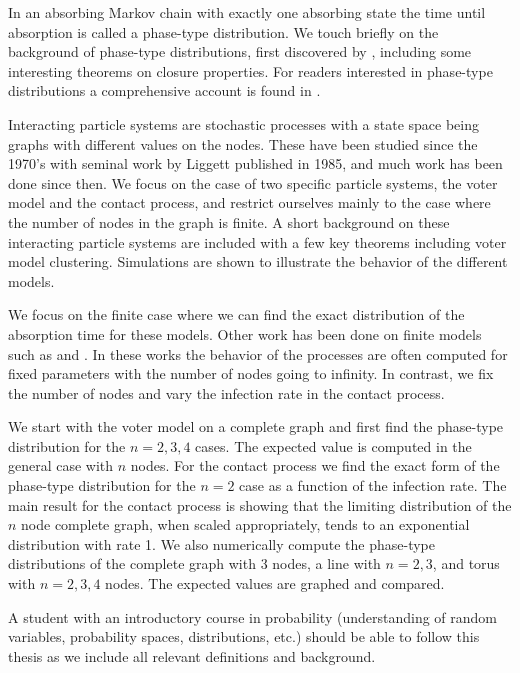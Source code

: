 In an absorbing Markov chain with exactly one absorbing state the time until absorption is called a phase-type distribution.
We touch briefly on the background of phase-type distributions, first discovered by \cite{neuts1975}, including some interesting theorems on closure properties.
For readers interested in phase-type distributions a comprehensive account is found in \cite{neuts1981}.

Interacting particle systems are stochastic processes with a state space being graphs with different values on the nodes.
These have been studied since the 1970's with seminal work by Liggett published in 1985, and much work has been done since then.
We focus on the case of two specific particle systems, the voter model and the contact process, and restrict ourselves mainly to the case where the number of nodes in the graph is finite.
A short background on these interacting particle systems are included with a few key theorems including voter model clustering.
Simulations are shown to illustrate the behavior of the different models.

We focus on the finite case where we can find the exact distribution of the absorption time for these models.
Other work has been done on finite models such as \cite{cox1989} and \cite{durrett1988}.
In these works the behavior of the processes are often computed for fixed parameters with the number of nodes going to infinity.
In contrast, we fix the number of nodes and vary the infection rate in the contact process.

We start with the voter model on a complete graph and first find the phase-type distribution for the $n = 2,3,4$ cases.
The expected value is computed in the general case with $n$ nodes.
For the contact process we find the exact form of the phase-type distribution for the $n = 2$ case as a function of the infection rate.
The main result for the contact process is showing that the limiting distribution of the $n$ node complete graph, when scaled appropriately, tends to an exponential distribution with rate 1.
We also numerically compute the phase-type distributions of the complete graph with 3 nodes, a line with $n = 2, 3$, and torus with $n = 2,3,4$ nodes.
The expected values are graphed and compared.

A student with an introductory course in probability (understanding of random variables, probability spaces, distributions, etc.) should be able to follow this thesis as we include all relevant definitions and background.




